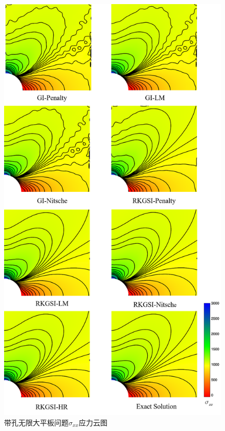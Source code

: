\begin{figure}[H]
\centering
   \includegraphics[scale=0.5]{figure/EHR/hole/sigmaxx.png}
\caption{带孔无限大平板问题$\sigma_{xx}$应力云图}\label{sigmaxx}
\end{figure} 
